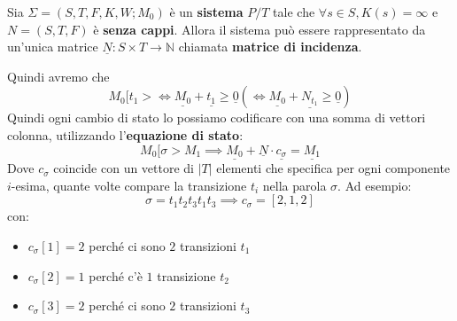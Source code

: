 \begin{definizione}
    Sia $\Sigma = (S,T,F,K,W;M_0)$ è un \textbf{sistema} $P/T$ tale che
    $\forall s\in S,K(s)=\infty$ e $N=(S,T,F)$ è \textbf{senza cappi}. Allora il
    sistema può essere rappresentato da un'unica matrice $\underline{N}:S\times
        T\rightarrow\mathbb{N}$
    chiamata \textbf{matrice di incidenza}.
\end{definizione}
Quindi avremo che
\begin{equation}
    M_0[t_1>\iff \underline{M_0}+\underline{t_1}\ge \underline{0} (\iff
    \underline{M_0}+\underline{N_{t_1}}\ge \underline{0})
\end{equation}
Quindi ogni cambio di stato lo possiamo codificare con una somma di vettori colonna,
utilizzando l'\textbf{equazione di stato}:
\begin{equation}
    M_0[\sigma>M_1\implies \underline{M_0}+\underline{N}\cdot \underline{c_\sigma}
    =\underline{M_1}
\end{equation}
Dove $c_\sigma$ coincide con un vettore di $|T|$ elementi che specifica per ogni
componente $i$-esima, quante volte compare la transizione $t_i$ nella parola $\sigma$.
Ad esempio:
$$\sigma = t_1t_2t_3t_1t_3 \implies c_\sigma = \left[2, 1, 2\right]$$
con:
\begin{itemize}
    \item $c_\sigma [1]= 2$ perché ci sono $2$ transizioni $t_1$
    \item $c_\sigma [2]= 1$ perché c'è $1$ transizione $t_2$
    \item $c_\sigma [3]= 2$ perché ci sono $2$ transizioni $t_3$
\end{itemize}

